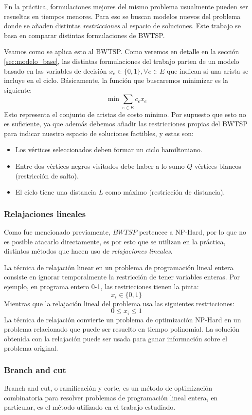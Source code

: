 \documentclass[10pt, a4paper]{article}
\theoremstyle{definition}
\begin{document}
En la práctica, formulaciones mejores del mismo problema usualmente pueden ser resueltas en tiempos menores. Para eso se buscan modelos nuevos del problema donde se añaden distintas \textit{restricciones} al espacio de soluciones. Este trabajo se basa en comparar distintas formulaciones de BWTSP.

Veamos como se aplica esto al BWTSP. Como veremos en detalle en la sección \ref{sec:modelo_base}, las distintas formulaciones del trabajo parten de un modelo basado en las variables de decisión $x_e \in \{0,1\}, \forall e \in E$ que indican si una arista se incluye en el ciclo. Básicamente, la función que buscaremos minimizar es la siguiente:
$$\min \sum_{e \in E} c_{e} x_{e}$$
Esto representa el conjunto de aristas de costo mínimo. Por supuesto que esto no es suficiente, ya que además debemos añadir las restricciones propias del BWTSP para indicar nuestro espacio de soluciones factibles, y estas son:
\begin{itemize}
  \item Los vértices seleccionados deben formar un ciclo hamiltoniano.
  \item Entre dos vértices negros visitados debe haber a lo sumo $Q$ vértices blancos (restricción de salto).
  \item El ciclo tiene una distancia $L$ como máximo (restricción de distancia).
\end{itemize} 

\subsubsection{Relajaciones lineales}
Como fue mencionado previamente, $BWTSP$ pertenece a NP-Hard, por lo que no es posible atacarlo directamente, es por esto que se utilizan en la práctica, distintos métodos que hacen uso de \textit{relajaciones lineales}.

La técnica de relajación linear en un problema de programación lineal entera consiste en ignorar temporalmente la restricción de tener variables enteras. Por ejemplo, en programa entero 0-1, las restricciones tienen la pinta:
$$x_i \in \{0,1\}$$
Mientras que la relajación lineal del problema usa las siguientes restricciones:
$$0 \leq x_i \leq 1$$
La técnica de relajación convierte un problema de optimización NP-Hard en un problema relacionado que puede ser resuelto en tiempo polinomial. La solución obtenida con la relajación puede ser usada para ganar información sobre el problema original. 


\subsubsection{Branch and cut}
Branch and cut, o ramificación y corte, es un método de optimización combinatoria para resolver problemas de programación lineal entera, en particular, es el método utilizado en el trabajo estudiado.
\end{document}

